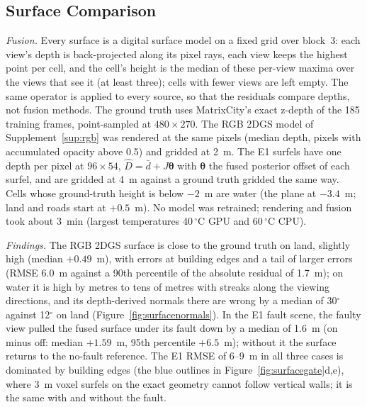 \subsection{Surface Comparison}
\label{sup:surface}
\emph{Fusion.} Every surface is a digital surface model on a fixed grid over block~3: each view's depth is
back-projected along its pixel rays, each view keeps the highest point per cell, and the cell's height is
the median of these per-view maxima over the views that see it (at least three); cells with fewer views
are left empty. The same operator is applied to every source, so that the residuals compare depths, not
fusion methods. The ground truth uses MatrixCity's exact z-depth of the 185 training frames, point-sampled at
$480\times270$. The RGB 2DGS model of Supplement~\ref{sup:rgb} was rendered at the same pixels (median depth,
pixels with accumulated opacity above 0.5) and gridded at 2~m. The E1 surfels have one depth per pixel at
$96\times54$, $\hat D=\bar d+J\boldsymbol\theta$ with $\boldsymbol\theta$ the fused posterior offset of
each surfel, and are gridded at 4~m against a ground truth gridded the same way. Cells whose
ground-truth height is below $-2$~m are water (the plane at $-3.4$~m; land and roads start at $+0.5$~m). No model
was retrained; rendering and fusion took about 3~min (largest temperatures 40\,$^{\circ}$C GPU and
60\,$^{\circ}$C CPU).

\emph{Findings.} The RGB 2DGS surface is close to the ground truth on land, slightly high (median
$+0.49$~m), with errors at building edges and a tail of larger errors (RMSE 6.0~m against a 90th
percentile of the absolute residual of 1.7~m); on water it is high by metres to tens of
metres with streaks along the viewing directions, and its depth-derived normals there are wrong by a median
of 30$^{\circ}$ against 12$^{\circ}$ on land (Figure~\ref{fig:surfacenormals}). In the E1 fault scene, the
faulty view pulled the fused surface under its fault down by a median of 1.6~m (on minus off: median
$+1.59$~m, 95th percentile $+6.5$~m); without it the surface returns to the no-fault reference. The E1 RMSE
of 6--9~m in all three cases is dominated by building edges (the blue outlines in
Figure~\ref{fig:surfacegate}d,e), where 3~m voxel surfels on the exact geometry cannot follow vertical walls;
it is the same with and without the fault.

\begin{table}[!htbp]
\centering
\caption{Height residuals (reconstruction minus ground truth) of the surfaces of MatrixCity block~3:
median, root mean square, 5th and 95th percentiles, 90th percentile of the absolute residual, and share
of cells within 1~m. E1 rows: the fault scene of Figure~\ref{fig:e1qualviews} ($8\sigma$ on 40\% of view 59)
fused with all views (gate off) and without the view the gate excluded (gate on), and the same noise
without the fault.}
\label{tab:surface}
\footnotesize\setlength{\tabcolsep}{4pt}

\end{table}

